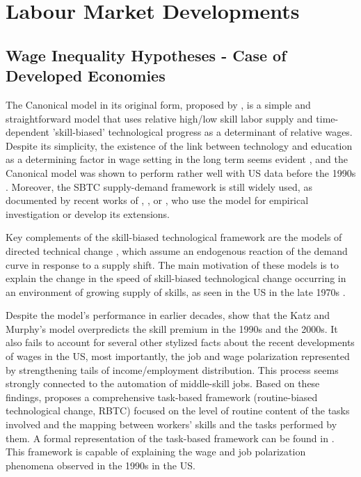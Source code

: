 \documentclass[11pt]{article}
\begin{document}
\section{Labour Market Developments}
\subsection{Wage Inequality Hypotheses - Case of Developed Economies}

The Canonical model in its original form, proposed by \citet{katz1992changes}, is a simple and straightforward model that uses relative high/low skill labor supply and time-dependent 'skill-biased' technological progress as a determinant of relative wages. Despite its simplicity, the existence of the link between technology and education as a determining factor in wage setting in the long term seems evident \citep{piketty2018capital}, and the Canonical model was shown to perform rather well with US data before the 1990s \citep{katz1992changes}. Moreover, the SBTC supply-demand framework is still widely used, as documented by recent works of \cite{glitz2021skill}, \cite{aziz2021between}, or \cite{farber2021unions}, who use the model for empirical investigation or develop its extensions.

Key complements of the skill-biased technological framework are the models of directed technical change \citep{acemoglu2002directed, acemoglu2002technical}, which assume an endogenous reaction of the demand curve in response to a supply shift. The main motivation of these models is to explain the change in the speed of skill-biased technological change occurring in an environment of growing supply of skills, as seen in the US in the late 1970s \citep{acemoglu2002directed}.

Despite the model's performance in earlier decades, \citet{acemoglu2011skills} show that the Katz and Murphy's model overpredicts the skill premium in the 1990s and the 2000s. It also fails to account for several other stylized facts about the recent developments of wages in the US, most importantly, the job and wage polarization represented by strengthening tails of income/employment distribution. This process seems strongly connected to the automation of middle-skill jobs. Based on these findings, \citet{acemoglu2012does} proposes a comprehensive task-based framework (routine-biased technological change, RBTC) focused on the level of routine content of the tasks involved and the mapping between workers' skills and the tasks performed by them. A formal representation of the task-based framework can be found in \citet{acemoglu2011skills}. This framework is capable of explaining the wage and job polarization phenomena observed in the 1990s in the US.
\end{document}
